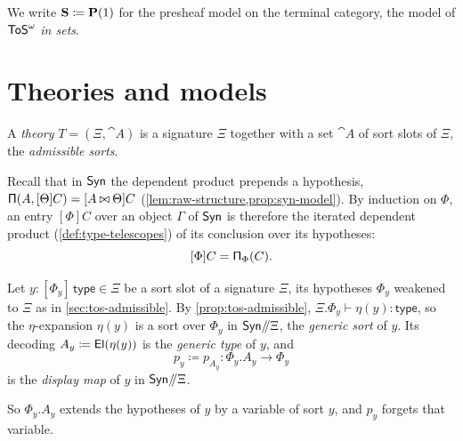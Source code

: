 We write $\mathbf{S} \coloneqq \mathbf{P}(1)$ for the presheaf model on the terminal category, the model of $\mathsf{ToS}^\omega$ \emph{in sets}.

\section{Theories and models}
\label{sec:theories}

\begin{definition}\label{def:theory}
    A \emph{theory} $T = (\Xi, \cat{A})$ is a signature $\Xi$ together with a set $\cat{A}$ of sort slots of $\Xi$, the \emph{admissible sorts}.
\end{definition}

Recall that in $\mathsf{Syn}$ the dependent product prepends a hypothesis, $\mathsf{\Pi}(A, [\Theta]C) = [A \mathbin{\bowtie} \Theta]C$ (\cref{lem:raw-structure,prop:syn-model}). By induction on $\Phi$, an entry $[\Phi]C$ over an object $\Gamma$ of $\mathsf{Syn}$ is therefore the iterated dependent product (\cref{def:type-telescopes}) of its conclusion over its hypotheses:
\begin{equation}\label{eq:entry-product}
    [\Phi]C = \mathsf{\Pi}_\Phi(C).
\end{equation}

\begin{definition}\label{def:display-map}
    Let $y : [\Phi_y]\,\mathsf{type} \in \Xi$ be a sort slot of a signature $\Xi$, its hypotheses $\Phi_y$ weakened to $\Xi$ as in \cref{sec:tos-admissible}. By \cref{prop:tos-admissible}, $\Xi.\Phi_y \vdash \eta(y) : \mathsf{type}$, so the $\eta$-expansion $\eta(y)$ is a sort over $\Phi_y$ in $\mathsf{Syn}\mathord{/\mkern-5mu/}\Xi$, the \emph{generic sort} of $y$. Its decoding $A_y \coloneqq \mathsf{El}(\eta(y))$ is the \emph{generic type} of $y$, and
    \[
        p_y \coloneqq p_{A_y} : \Phi_y.A_y \to \Phi_y
    \]
    is the \emph{display map} of $y$ in $\mathsf{Syn}\mathord{/\mkern-5mu/}\Xi$.
\end{definition}

So $\Phi_y.A_y$ extends the hypotheses of $y$ by a variable of sort $y$, and $p_y$ forgets that variable.

